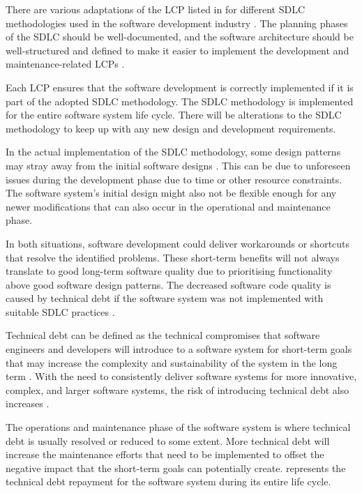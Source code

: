 There are various adaptations of the LCP listed in  for different SDLC methodologies used in the software development industry \cite{Al-Saiyd2015}. The planning phases of the SDLC should be well-documented, and the software architecture should be well-structured and defined to make it easier to implement the development and maintenance-related LCPs \cite{Ackermann2009}.\par Each LCP ensures that the software development is correctly implemented if it is part of the adopted SDLC methodology. The SDLC methodology is implemented for the entire software system life cycle. There will be alterations to the SDLC methodology to keep up with any new design and development requirements.\par In the actual implementation of the SDLC methodology, some design patterns may stray away from the initial software designs \cite{Reimanis2016}. This can be due to unforeseen issues during the development phase due to time or other resource constraints. The software system's initial design might also not be flexible enough for any newer modifications that can also occur in the operational and maintenance phase.\par In both situations, software development could deliver workarounds or shortcuts that resolve the identified problems. These short-term benefits will not always translate to good long-term software quality due to prioritising functionality above good software design patterns. The decreased software code quality is caused by technical debt if the software system was not implemented with suitable SDLC practices \cite{DeLeon-Sigg2020, Reimanis2016}.\par Technical debt can be defined as the technical compromises that software engineers and developers will introduce to a software system for short-term goals that may increase the complexity and sustainability of the system in the long term \cite{Snipes2018, Gralha2018}. With the need to consistently deliver software systems for more innovative, complex, and larger software systems, the risk of introducing technical debt also increases \cite{Reimanis2016, Khan2013}.\par The operations and maintenance phase of the software system is where technical debt is usually resolved or reduced to some extent. More technical debt will increase the maintenance efforts that need to be implemented to offset the negative impact that the short-term goals can potentially create.  represents the technical debt repayment for the software system during its entire life cycle.

